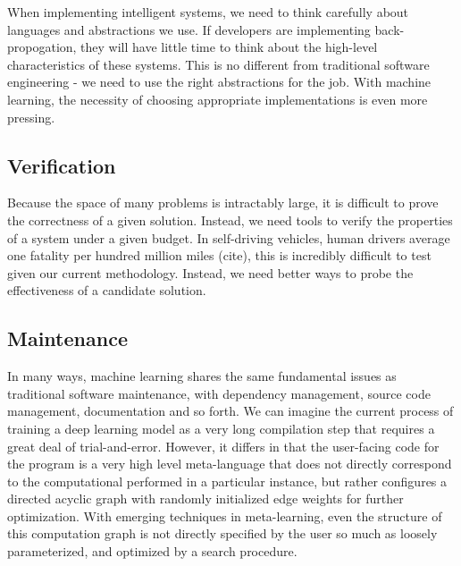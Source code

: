 \documentclass[12pt,initial,twoside,maitrise]{dms}
\numberwithin{equation}{section}
\numberwithin{table}{chapter}
\numberwithin{figure}{chapter}
\begin{document}
When implementing intelligent systems, we need to think carefully about languages and abstractions we use. If developers are implementing back-propogation, they will have little time to think about the high-level characteristics of these systems. This is no different from traditional software engineering - we need to use the right abstractions for the job. With machine learning, the necessity of choosing appropriate implementations is even more pressing.

\subsection{Verification}

Because the space of many problems is intractably large, it is difficult to prove the correctness of a given solution. Instead, we need tools to verify the properties of a system under a given budget. In self-driving vehicles, human drivers average one fatality per hundred million miles (cite), this is incredibly difficult to test given our current methodology. Instead, we need better ways to probe the effectiveness of a candidate solution.

\subsection{Maintenance}

In many ways, machine learning shares the same fundamental issues as traditional software maintenance, with dependency management, source code management, documentation and so forth. We can imagine the current process of training a deep learning model as a very long compilation step that requires a great deal of trial-and-error. However, it differs in that the user-facing code for the program is a very high level meta-language that does not directly correspond to the computational performed in a particular instance, but rather configures a directed acyclic graph with randomly initialized edge weights for further optimization. With emerging techniques in meta-learning, even the structure of this computation graph is not directly specified by the user so much as loosely parameterized, and optimized by a search procedure.
\end{document}
